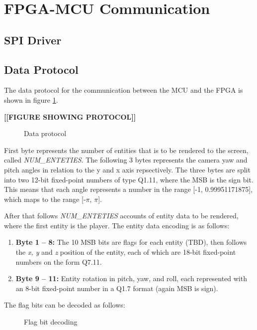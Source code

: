 \section{FPGA-MCU Communication}
\subsection{SPI Driver}
\subsection{Data Protocol}
The data protocol for the communication between the MCU and the FPGA is shown in 
figure \ref{fig:spi_data_protocol}.

\textbf{[[FIGURE SHOWING PROTOCOL]]}
\begin{figure}[H]
    \centering
    \caption{Data protocol}
    \label{fig:spi_data_protocol}
\end{figure}

First byte represents the number of entities that is to be rendered to the screen,
called \textit{NUM\_ENTETIES}. The following 3 bytes represents the camera yaw and pitch angles in 
relation to the y and x axis repsectively. The three bytes are split into two 12-bit 
fixed-point numbers of type Q1.11, where the MSB is the sign bit. This means that 
each angle represents a number in the range [-1, 0.99951171875], which maps to the 
range [-$\pi$, $\pi$].

After that follows \textit{NUM\_ENTETIES} accounts of entity data to be rendered, where 
the first entity is the player. The entity data encoding is as follows:
\begin{enumerate}
    \item \textbf{Byte 1 -- 8:} The 10 MSB bits are flags for each entity (TBD), then follows 
        the \textit{x, y} and \textit{z} position of the entity, each of which are 18-bit fixed-point 
        numbers on the form Q7.11.
    \item \textbf{Byte 9 -- 11:} Entity rotation in pitch, yaw, and roll, each represented with an 
        8-bit fixed-point number in a Q1.7 format (again MSB is sign).
\end{enumerate}

The flag bits can be decoded as follows:
\begin{figure}[H]
    \centering
    \caption{Flag bit decoding}
    \label{fig:flag_bit_decoding}
\end{figure}
